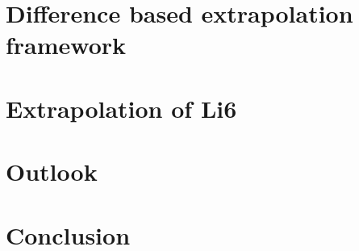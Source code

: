 \chapter{Difference based extrapolation framework}
\label{chap:diff}


\chapter{Extrapolation of Li6}
\label{chap:li6}


\chapter{Outlook}
\label{chap:outlook}


\chapter{Conclusion}
\label{chap:conclusion}



\printbibliography

